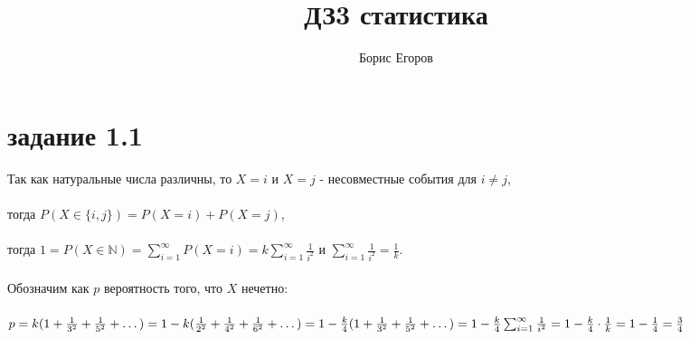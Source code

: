 \documentclass[a4paper]{article}
\author{Борис Егоров}
\title{ДЗ3 статистика}
\begin{document}
	\maketitle
	\section*{задание 1.1}
	\begin{large}
		Так как натуральные числа различны, то $X=i$ и $X=j$ - несовместные события для $i \ne j$,\\
		\\
		тогда $P(X \in \lbrace i,j \rbrace)=P(X=i)+P(X=j)$,\\
		\\
		тогда $1=P(X \in \mathbb{N})=\sum_{i=1}^{\infty}P(X=i) = k\sum_{i=1}^{\infty}\frac{1}{i^2}$ и $\sum_{i=1}^{\infty}\frac{1}{i^2}=\frac{1}{k}$.\\
		\\
		Обозначим как $p$ вероятность того, что $X$ нечетно:\\
		\\
		$p=k(1+\frac{1}{3^2}+\frac{1}{5^2}+\dots)=\\
		\\
		1-k(\frac{1}{2^2}+\frac{1}{4^2}+\frac{1}{6^2}+\dots)=\\
		\\
		1-\frac{k}{4}(1+\frac{1}{3^2}+\frac{1}{5^2}+\dots)=
		1-\frac{k}{4}\sum_{i=1}^{\infty}\frac{1}{i^2}=1-\frac{k}{4} \cdot \frac{1}{k}=1-\frac{1}{4}=\frac{3}{4}$\\
	\end{large}
\end{document}
